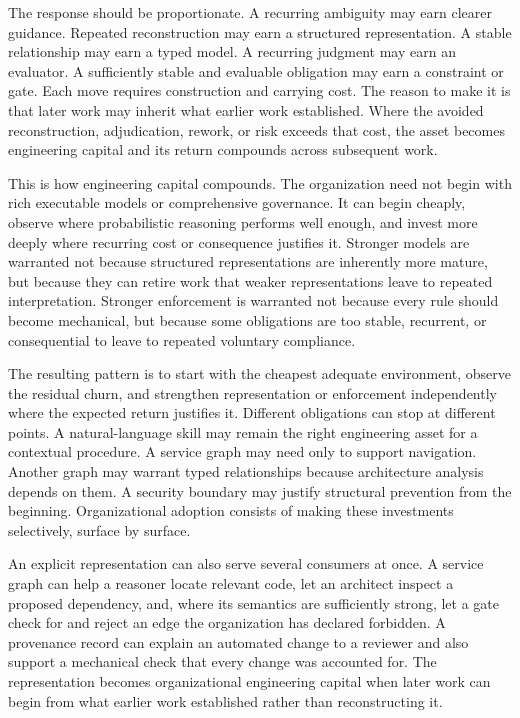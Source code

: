 The response should be proportionate. A recurring ambiguity may earn clearer guidance. Repeated reconstruction may earn a structured representation. A stable relationship may earn a typed model. A recurring judgment may earn an evaluator. A sufficiently stable and evaluable obligation may earn a constraint or gate. Each move requires construction and carrying cost. The reason to make it is that later work may inherit what earlier work established. Where the avoided reconstruction, adjudication, rework, or risk exceeds that cost, the asset becomes engineering capital and its return compounds across subsequent work.

This is how engineering capital compounds. The organization need not begin with rich executable models or comprehensive governance. It can begin cheaply, observe where probabilistic reasoning performs well enough, and invest more deeply where recurring cost or consequence justifies it. Stronger models are warranted not because structured representations are inherently more mature, but because they can retire work that weaker representations leave to repeated interpretation. Stronger enforcement is warranted not because every rule should become mechanical, but because some obligations are too stable, recurrent, or consequential to leave to repeated voluntary compliance.

The resulting pattern is to start with the cheapest adequate environment, observe the residual churn, and strengthen representation or enforcement independently where the expected return justifies it. Different obligations can stop at different points. A natural-language skill may remain the right engineering asset for a contextual procedure. A service graph may need only to support navigation. Another graph may warrant typed relationships because architecture analysis depends on them. A security boundary may justify structural prevention from the beginning. Organizational adoption consists of making these investments selectively, surface by surface.

An explicit representation can also serve several consumers at once. A service graph can help a reasoner locate relevant code, let an architect inspect a proposed dependency, and, where its semantics are sufficiently strong, let a gate check for and reject an edge the organization has declared forbidden. A provenance record can explain an automated change to a reviewer and also support a mechanical check that every change was accounted for. The representation becomes organizational engineering capital when later work can begin from what earlier work established rather than reconstructing it.

